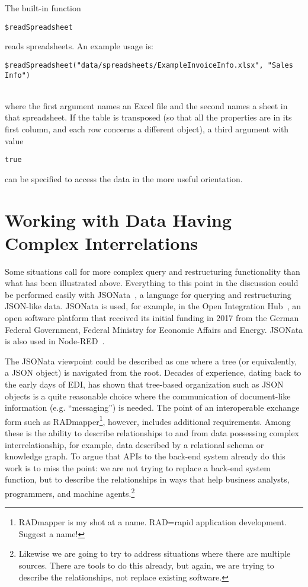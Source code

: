 \documentclass[9pt,letterpaper]{article}
\newcommand{\stt}[1]{\begin{footnotesize}\texttt{#1}\end{footnotesize}}
\begin{document}
The built-in function \stt{\$readSpreadsheet} reads spreadsheets.
An example usage is:\\
\vspace{3mm}
\stt{\$readSpreadsheet("data/spreadsheets/ExampleInvoiceInfo.xlsx", "Sales Info")} \\
\vspace{3mm}
where the first argument names an Excel file and the second names a sheet in that spreadsheet.
If the table is transposed (so that all the properties are in its first column, and each row concerns a different object), a third argument with value \stt{true} can be specified to access the data in the more useful orientation.

\section{Working with Data Having Complex Interrelations}

Some situations call for more complex query and restructuring functionality than what has been illustrated above.
Everything to this point in the discussion could be performed easily with JSONata~\cite{Jsonata.org2021}, a language for querying and restructuring JSON-like data.
JSONata is used, for example, in the Open Integration Hub~\cite{OIH2021}, an open software platform that received its initial funding in 2017 from the German Federal Government,
Federal Ministry for Economic Affairs and Energy. %
JSONata is also used in Node-RED~\cite{Node-Red2021}.

The JSONata viewpoint could be described as one where a tree (or equivalently, a JSON object) is navigated from the root.
Decades of experience, dating back to the early days of EDI, has shown that tree-based organization such as JSON objects is a quite reasonable choice where the communication of document-like information (e.g. ``messaging'') is needed.
The point of an interoperable exchange form such as RADmapper\footnote{RADmapper is my shot at a name. RAD=rapid application development. Suggest a name!}, however, includes additional requirements.
Among these is the ability to describe relationships to and from data possessing complex interrelationship, for example, data described by a relational schema or knowledge graph.
To argue that APIs to the back-end system already do this work is to miss the point:
we are not trying to replace a back-end system function, but to describe the relationships in ways that help business analysts, programmers, and machine agents.\footnote{Likewise we are going to try to address
  situations where there are multiple sources. There are tools to do this already, but again, we are trying to describe the relationships, not replace existing software.}
\end{document}
